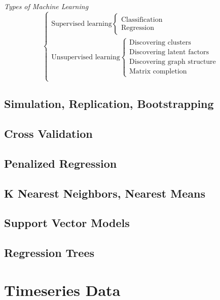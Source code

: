 \documentclass[12pt]{article}\usepackage[]{graphicx}\usepackage[]{color}
\begin{document}
\begin{flushleft}
\textit{Types of Machine Learning}
\begin{equation}\nonumber
\begin{cases}
\text{Supervised learning} \begin{cases} \text{Classification} \\ \text{Regression} \end{cases}\\
\text{Unsupervised learning} \begin{cases} \text{Discovering clusters} \\ \text{Discovering latent factors} \\ \text{Discovering graph structure} \\ \text{Matrix completion} \end{cases}\\
\end{cases}
\end{equation}


\subsection{Simulation, Replication, Bootstrapping}

\subsection{Cross Validation}

\subsection{Penalized Regression}

\subsection{K Nearest Neighbors, Nearest Means}

\subsection{Support Vector Models}

\subsection{Regression Trees}



\clearpage
\section{Timeseries Data}


\end{flushleft}
\end{document}
